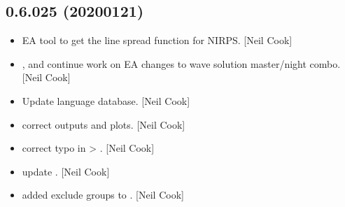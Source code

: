 \documentclass[a4paper,10pt,english]{report}
\begin{document}
\subsection{0.6.025 (2020\sphinxhyphen{}01\sphinxhyphen{}21)}
\label{\detokenize{misc/changelog:id13}}\begin{itemize}
\item {} 
 \sphinxhyphen{} EA tool to get the line spread function for
NIRPS. {[}Neil Cook{]}

\item {} 
,  and
 \sphinxhyphen{} continue work on EA changes to wave solution
master/night combo. {[}Neil Cook{]}

\item {} 
Update language database. {[}Neil Cook{]}

\item {} 
 \sphinxhyphen{} correct 
outputs and plots. {[}Neil Cook{]}

\item {} 
 \sphinxhyphen{} correct typo in
  \textendash{}\textgreater{} . {[}Neil Cook{]}

\item {} 
 \sphinxhyphen{} update
. {[}Neil Cook{]}

\item {} 
 \sphinxhyphen{} added exclude groups to .
{[}Neil Cook{]}

\end{itemize}
\end{document}
